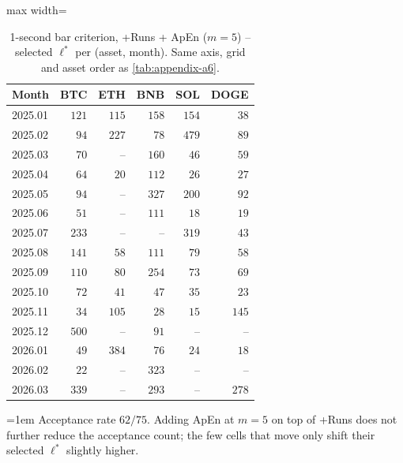\documentclass[11pt,titlepage,openany,oneside]{book}  %
\newcommand{\floatnote}[1]{%
  \par\smallskip\noindent%
  \begin{minipage}{\linewidth}%
    \footnotesize\emergencystretch=1em #1%
  \end{minipage}\par%
}
\begin{document}
\begin{table}[!htbp]
  \caption[1-second bar +Runs + ApEn criterion -- selected $\ell^*$]{1-second bar criterion, +Runs + ApEn ($m = 5$) -- selected $\ell^*$ per (asset, month). Same axis, grid and asset order as \cref{tab:appendix-a6}.}
  \label{tab:appendix-a6c}
  \begin{center}
    \begin{adjustbox}{max width=\textwidth}
    \begin{tabular}{lrrrrr}
      \toprule
      Month   & BTC   & ETH   & BNB   & SOL   & DOGE  \\
      \midrule
      2025.01 & $121$ & $115$ & $158$ & $154$ & $38$  \\
      2025.02 & $94$  & $227$ & $78$  & $479$ & $89$  \\
      2025.03 & $70$  & --    & $160$ & $46$  & $59$  \\
      2025.04 & $64$  & $20$  & $112$ & $26$  & $27$  \\
      2025.05 & $94$  & --    & $327$ & $200$ & $92$  \\
      2025.06 & $51$  & --    & $111$ & $18$  & $19$  \\
      2025.07 & $233$ & --    & --    & $319$ & $43$  \\
      2025.08 & $141$ & $58$  & $111$ & $79$  & $58$  \\
      2025.09 & $110$ & $80$  & $254$ & $73$  & $69$  \\
      2025.10 & $72$  & $41$  & $47$  & $35$  & $23$  \\
      2025.11 & $34$  & $105$ & $28$  & $15$  & $145$ \\
      2025.12 & $500$ & --    & $91$  & --    & --    \\
      2026.01 & $49$  & $384$ & $76$  & $24$  & $18$  \\
      2026.02 & $22$  & --    & $323$ & --    & --    \\
      2026.03 & $339$ & --    & $293$ & --    & $278$ \\
      \bottomrule
    \end{tabular}
    \end{adjustbox}
  \end{center}
  \floatnote{Acceptance rate $62/75$. Adding ApEn at $m = 5$ on top of +Runs does not further reduce the acceptance count; the few cells that move only shift their selected $\ell^*$ slightly higher.}
\end{table}
\end{document}
